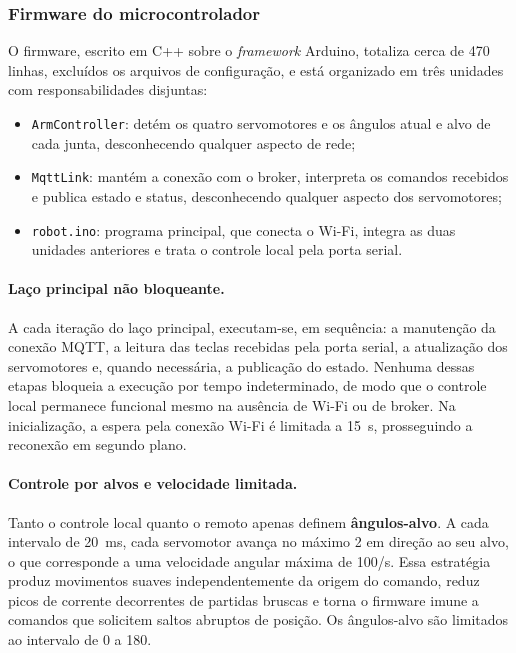 \documentclass[12pt]{article}
\begin{document}
\subsubsection{Firmware do microcontrolador}
\label{subsec:firmware}

O firmware, escrito em C++ sobre o \textit{framework} Arduino, totaliza cerca de 470 linhas, excluídos os arquivos de configuração, e está organizado em três unidades com responsabilidades disjuntas:

\begin{itemize}
    \item \texttt{ArmController}: detém os quatro servomotores e os ângulos atual e alvo de cada junta, desconhecendo qualquer aspecto de rede;
    \item \texttt{MqttLink}: mantém a conexão com o broker, interpreta os comandos recebidos e publica estado e status, desconhecendo qualquer aspecto dos servomotores;
    \item \texttt{robot.ino}: programa principal, que conecta o Wi-Fi, integra as duas unidades anteriores e trata o controle local pela porta serial.
\end{itemize}

\paragraph{Laço principal não bloqueante.} A cada iteração do laço principal, executam-se, em sequência: a manutenção da conexão MQTT, a leitura das teclas recebidas pela porta serial, a atualização dos servomotores e, quando necessária, a publicação do estado. Nenhuma dessas etapas bloqueia a execução por tempo indeterminado, de modo que o controle local permanece funcional mesmo na ausência de Wi-Fi ou de broker. Na inicialização, a espera pela conexão Wi-Fi é limitada a 15~s, prosseguindo a reconexão em segundo plano.

\paragraph{Controle por alvos e velocidade limitada.} Tanto o controle local quanto o remoto apenas definem \textbf{ângulos-alvo}. A cada intervalo de 20~ms, cada servomotor avança no máximo 2\textdegree{} em direção ao seu alvo, o que corresponde a uma velocidade angular máxima de 100\textdegree/s. Essa estratégia produz movimentos suaves independentemente da origem do comando, reduz picos de corrente decorrentes de partidas bruscas e torna o firmware imune a comandos que solicitem saltos abruptos de posição. Os ângulos-alvo são limitados ao intervalo de 0\textdegree{} a 180\textdegree.
\end{document}

